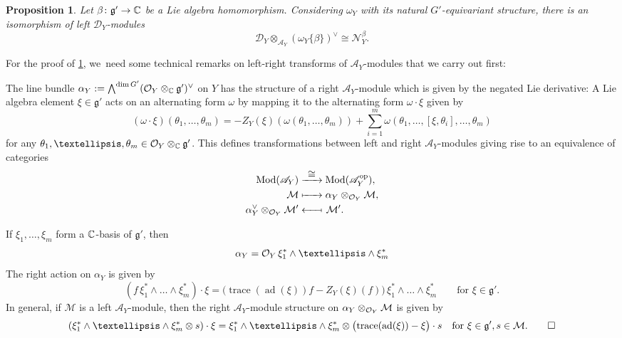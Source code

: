 \documentclass[11pt]{article}
\newcommand{\To}[1]{\mathchoice{\xrightarrow{\textstyle\kern4pt#1\kern3pt}}{\xrightarrow{\,#1\,}}{}{}}
\newcommand\Mto[1]{\mathrel{\mapstochar\To{#1}}}
\newcommand{\From}[1]{\mathchoice{\xleftarrow{\textstyle~#1~}}{\xleftarrow{\,#1\,}}{}{}}
\newcommand\Mfrom[1]{\mathrel{\From{#1}\joinrel\mapstochar}}
\newtheorem{prop}[thm]{Proposition}
\newcommand{\cA}{\mathscr{A}}
\newcommand{\frg}{\mathfrak{g}}
\DeclareMathOperator{\ad}{ad}
\DeclareMathOperator{\trace}{trace}
\begin{document}
\begin{prop} \label{prop:interpretationOfNBeta}
Let $\beta \colon \frg' \to \C$ be a Lie algebra homomorphism. Considering $\omega_Y$ with its natural $G'$-equivariant structure, there is an isomorphism of left $\mathscr{D}_Y$\nobreakdash-mod\-ules
\[
\mathscr{D}_Y \otimes_{\cA_Y} (\omega_Y\{\beta\})^\vee \cong \mathscr{N}_{Y}^{\beta}.
\]
\end{prop}

For the proof of \cref{prop:interpretationOfNBeta}, we~need some technical remarks on left-right transforms of $\cA_Y$\nobreakdash-mod\-ules that we carry out first:

The line bundle $\alpha_Y := \bigwedge^{\dim G'} (\O_Y \otimes_\C \frg')^\vee$ on $Y$ has the structure of a right $\cA_Y$\nobreakdash-mod\-ule which is given by the negated Lie derivative: A Lie algebra element $\xi \in \frg'$ acts on an alternating form $\omega$ by mapping it to the alternating form $\omega \cdot \xi$ given by
\[
(\omega \cdot \xi)(\theta_1,\dots,\theta_m) = -Z_Y(\xi)(\omega(\theta_1,\dots,\theta_m)) + \sum_{i=1}^m \omega(\theta_1,\dots,[\xi,\theta_i],\dots,\theta_m)
\]
for any $\theta_1,\dots,\theta_m \in \O_Y \otimes_\C \frg'$. This defines transformations between left and right $\cA_Y$\nobreakdash-mod\-ules giving rise to an equivalence of categories
\begin{align*}
\operatorname{Mod}(\cA_Y) &\To{\cong} \operatorname{Mod}(\cA_Y^{\text{op}}), \\
\mathcal M &\Mto{\hphantom{\cong}} \alpha_Y \otimes_{\O_Y} \mathcal M, \\
\alpha_Y^\vee \otimes_{\O_Y} \mathcal M' &\Mfrom{\hphantom{\cong}}\; \mathcal M'.
\end{align*}

\begin{rmk} \label{rem:explicitLeftRightTransform}
If $\xi_1,\dots,\xi_m$ form a ${\mathbb C}$-basis of $\frg'$, then
\[
\alpha_Y = \O_Y \, \xi_1^* \wedge \dots \wedge \xi_m^*
\]
The right action on $\alpha_Y$ is given by
\[
(f\, \xi_1^* \wedge \dots \wedge \xi_m^*) \cdot \xi = \big(\!\trace(\ad(\xi))f-Z_Y(\xi)(f)\big) \, \xi_1^* \wedge \dots \wedge \xi_m^* \qquad \text{for } \xi \in \frg'.
\]
In general, if $\mathcal M$ is a left $\cA_Y$\nobreakdash-mod\-ule, then the right $\cA_Y$\nobreakdash-mod\-ule structure on $\alpha_Y \otimes_{\mathcal{O}_Y} \mathcal M$ is given by
\[
(\xi_1^* \wedge \dots \wedge \xi_m^* \otimes s) \cdot \xi = \xi_1^* \wedge \dots \wedge \xi_m^* \otimes \big(\!\trace(\ad(\xi))-\xi\big) \cdot s \quad \text{for } \xi \in \frg', s \in \mathcal M.\qedhere
\]
\end{rmk}
\end{document}
